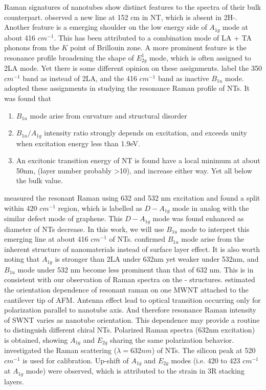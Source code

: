 Raman signatures of  nanotubes show distinct features to the spectra of their bulk counterpart. \citeauthor{JMR7990865} observed a new line at 152 cm in  NT, which is absent in 2H-.\cite{JMR7990865} Another feature is a emerging shoulder on the low energy side of $A_{1g}$ mode at about 416 $cm^{-1}$. This has been attributed to a combination mode of LA + TA phonons from the $K$ point of Brillouin zone.\cite{Sourisseau1991} A more prominent feature is the resonance profile broadening the shape of $E_{2g}^1$ mode, which is often assigned to 2LA mode. Yet there is some different opinion on these assignments. \citeauthor{Molina-Sanchez2011} label the 350 $cm^{-1}$ band as  instead of 2LA, and the 416 $cm^{-1}$ band as inactive $B_{1u}$ mode.\cite{Molina-Sanchez2011} \citeauthor{Staiger2012} adopted these assignments in studying the resonance Raman profile of  NTs.\cite{Staiger2012} It was found that
\begin{enumerate}
\item $B_{1u}$ mode arise from curvature and structural disorder
\item $B_{1u}/A_{1g}$ intensity ratio strongly depends on excitation, and exceeds unity when excitation energy less than 1.9eV.
\item  An excitonic transition energy of NT is found have a local minimum at about 50nm, (layer number probably \textgreater 10), and increase either way. Yet all below the bulk value.
\end{enumerate}

\citeauthor{Krause2009} measured the resonant Raman using 632 and 532 nm excitation and found a split within 420 $cm^{-1}$ region, which is labelled as $D-A_{1g}$ mode in analog with the similar defect mode of graphene.\cite{Krause2009} This  $D-A_{1g}$ mode was found enhanced as diameter of  NTs decrease. In this work, we will use $B_{1u}$ mode to interpret this emerging line at about 416 $cm^{-1}$ of  NTs. \citeauthor{Krause2009a} confirmed $B_{1u}$ mode arise from the inherent structure of  nanomaterials instead of surface layer effect. It is also worth noting that $A_{1g}$ is stronger than 2LA under 632nm yet weaker under 532nm, and $B_{1u}$ mode under 532 nm become less prominent than that of 632 nm.\cite{Krause2009a} This is in consistent with our observation of Raman spectra on the - structures. \citeauthor{Rafailov2005} estimated the orientation dependence of resonant raman on one MWNT  attached to the cantilever tip of AFM.\cite{Rafailov2005} Antenna effect lead to optical transition occurring only for polarization parallel to nanotube axis. And therefore resonance Raman intensity of SWNT varies as nanotube orientation. This dependence may provide a routine to distinguish different chiral NTs. Polarized Raman spectra (632nm excitation) is obtained, showing $A_{1g}$ and $E_{2g}$ sharing the same polarization behavior. \citeauthor{Virsek2007} investigated the Raman scattering ($\lambda=632nm$) of  NTs.\cite{Virsek2007} The silicon peak at 520 $cm^{-1}$ is used for calibration. Up-shift of $A_{1g}$ and $E_{2g}$ modes (i.e. 420 to 423 $cm^{-1}$ at $A_{1g}$ mode) were observed, which is attributed to the strain in 3R stacking layers.


